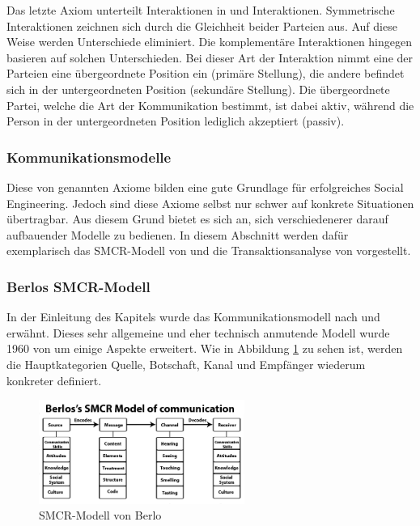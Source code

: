 Das letzte Axiom unterteilt Interaktionen in  und  Interaktionen.
Symmetrische Interaktionen zeichnen sich durch die Gleichheit beider Parteien aus.
Auf diese Weise werden Unterschiede eliminiert.
Die komplementäre Interaktionen hingegen basieren auf solchen Unterschieden.
Bei dieser Art der Interaktion nimmt eine der Parteien eine übergeordnete Position ein (primäre Stellung), die andere befindet sich in der untergeordneten Position (sekundäre Stellung).
Die übergeordnete Partei, welche die Art der Kommunikation bestimmt, ist dabei aktiv, während die Person in der untergeordneten Position lediglich akzeptiert (passiv).
\citep{grundlagen-der-kommunikation}
\citep{watzlawick}



\subsubsection{Kommunikationsmodelle}

Diese von  genannten Axiome bilden eine gute Grundlage für erfolgreiches Social Engineering.
Jedoch sind diese Axiome selbst nur schwer auf konkrete Situationen übertragbar.
Aus diesem Grund bietet es sich an, sich verschiedenerer darauf aufbauender Modelle zu bedienen.
In diesem Abschnitt werden dafür exemplarisch das SMCR-Modell von  und die Transaktionsanalyse von  vorgestellt.

\subsubsection*{Berlos SMCR-Modell}

In der Einleitung des Kapitels  wurde das Kommunikationsmodell nach  und  erwähnt.
Dieses sehr allgemeine und eher technisch anmutende Modell wurde 1960 von  um einige Aspekte erweitert.
Wie in Abbildung \ref{fig:smcr-model-berlo} zu sehen ist, werden die Hauptkategorien Quelle, Botschaft, Kanal und Empfänger wiederum konkreter definiert.

\begin{figure}[htbp]
	\centering
	\includegraphics[width=0.6\textwidth]{abb/berlos-smcr-model.jpg}
	\caption{SMCR-Modell von Berlo}
	\label{fig:smcr-model-berlo}
\end{figure}

